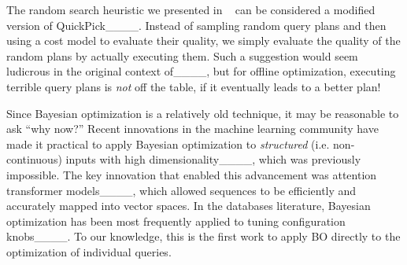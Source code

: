 The random search heuristic we presented in ~ can be considered a modified version of QuickPick____. Instead of sampling random query plans and then using a cost model to evaluate their quality, we simply evaluate the quality of the random plans by actually executing them. Such a suggestion would seem ludicrous in the original context of____, but for offline optimization, executing terrible query plans is \emph{not} off the table, if it eventually leads to a better plan! 

Since Bayesian optimization is a relatively old technique, it may be reasonable to ask ``why now?'' Recent innovations in the machine learning community have made it practical to apply Bayesian optimization to \emph{structured} (i.e. non-continuous) inputs with high dimensionality____, which was previously impossible. The key innovation that enabled this advancement was attention transformer models____, which allowed sequences to be efficiently and accurately mapped into vector spaces. In the databases literature, Bayesian optimization has been most frequently applied to tuning configuration knobs____. To our knowledge, this is the first work to apply BO directly to the optimization of individual queries.


